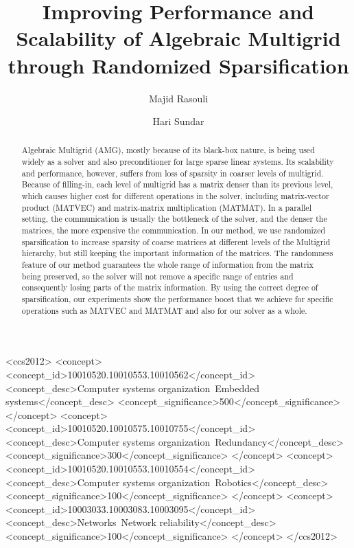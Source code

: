 \documentclass[sigconf]{acmart}
\begin{document}
\title{Improving Performance and Scalability of Algebraic Multigrid through Randomized Sparsification}

\author{Majid Rasouli}

\author{Hari Sundar}




\begin{abstract}
Algebraic Multigrid (AMG), mostly because of its black-box nature, is being used widely as a solver and also preconditioner for large sparse linear systems. Its scalability and performance, however, suffers from loss of sparsity in coarser levels of multigrid. Because of filling-in, each level of multigrid has a matrix denser than its previous level, which causes higher cost for different operations in the solver, including matrix-vector product (MATVEC) and matrix-matrix multiplication (MATMAT). In a parallel setting, the communication is usually the bottleneck of the solver, and the denser the matrices, the more expensive the communication. 
In our method, we use randomized sparsification to increase sparsity of coarse matrices at different levels of the Multigrid hierarchy, but still keeping the important information of the matrices. The randomness feature of our method guarantees the whole range of information from the matrix being preserved, so the solver will not remove a specific range of entries and consequently losing parts of the matrix information. By using the correct degree of sparsification, our experiments show the performance boost that we achieve for specific operations such as MATVEC and MATMAT and also for our solver as a whole.
\end{abstract}

%
%
\iffalse
\begin{CCSXML}
<ccs2012>
 <concept>
  <concept_id>10010520.10010553.10010562</concept_id>
  <concept_desc>Computer systems organization~Embedded systems</concept_desc>
  <concept_significance>500</concept_significance>
 </concept>
 <concept>
  <concept_id>10010520.10010575.10010755</concept_id>
  <concept_desc>Computer systems organization~Redundancy</concept_desc>
  <concept_significance>300</concept_significance>
 </concept>
 <concept>
  <concept_id>10010520.10010553.10010554</concept_id>
  <concept_desc>Computer systems organization~Robotics</concept_desc>
  <concept_significance>100</concept_significance>
 </concept>
 <concept>
  <concept_id>10003033.10003083.10003095</concept_id>
  <concept_desc>Networks~Network reliability</concept_desc>
  <concept_significance>100</concept_significance>
 </concept>
</ccs2012>
\end{CCSXML}
\end{document}
